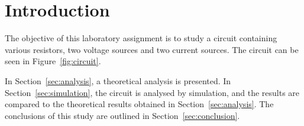 \section{Introduction}
\label{sec:introduction}

The objective of this laboratory assignment is to study a circuit containing
various resistors, two voltage sources and two current sources. The circuit can be seen in Figure~\ref{fig:circuit}.


In Section~\ref{sec:analysis}, a theoretical analysis is
presented. In Section~\ref{sec:simulation}, the circuit is analysed by
simulation, and the results are compared to the theoretical results obtained in
Section~\ref{sec:analysis}. The conclusions of this study are outlined in
Section~\ref{sec:conclusion}.


